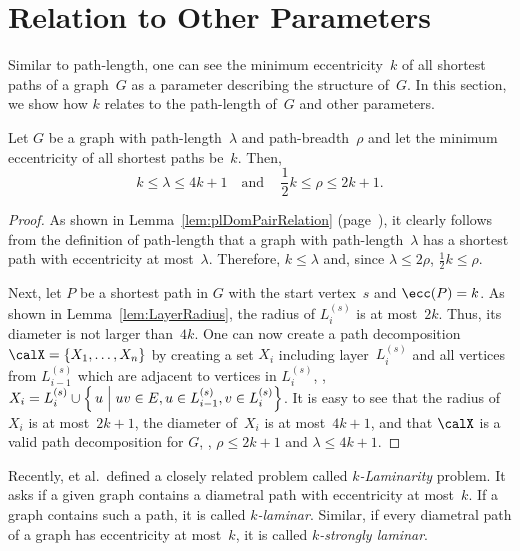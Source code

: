\section{Relation to Other Parameters}

Similar to path-length, one can see the minimum eccentricity~$k$ of all shortest paths of a graph~$G$ as a parameter describing the structure of~$G$.
In this section, we show how $k$ relates to the path-length of~$G$ and other parameters.

\begin{theorem}
    \label{theo:PathLengthMinEcc}
Let \( G \) be a graph with path-length~\( \lambda \) and path-breadth~\( \rho \) and let the minimum eccentricity of all shortest paths be~\( k \).
Then,
\[
    k \leq \lambda \leq 4k + 1 \quad \text{and} \, \quad \frac{1}{2} k \leq \rho \leq 2k + 1.
\]
\end{theorem}

\begin{proof}
As shown in Lemma~\ref{lem:plDomPairRelation} (page~\pageref{lem:plDomPairRelation}), it clearly follows from the definition of path-length that a graph with path-length~$\lambda$ has a shortest path with eccentricity at most~$\lambda$.
Therefore, $k \leq \lambda$ and, since $\lambda \leq 2 \rho$, $\frac{1}{2} k \leq \rho$.

Next, let $P$ be a shortest path in $G$ with the start vertex~$s$ and $\ecc(P) = k$.
As shown in Lemma~\ref{lem:LayerRadius}, the radius of $L_i^{(s)}$ is at most~$2k$.
Thus, its diameter is not larger than~$4k$.
One can now create a path decomposition $\calX = \{X_1, \ldots, X_n\}$ by creating a set $X_i$ including layer~$L_i^{(s)}$ and all vertices from $L_{i-1}^{(s)}$ which are adjacent to vertices in $L_i^{(s)}$, \ie, $X_i = L_i^{(s)} \cup \left \{ \, u \Bigm| uv \in E, u \in L_{i-1}^{(s)}, v \in L_i^{(s)} \right \}$.
It is easy to see that the radius of~$X_i$ is at most~$2k +1$, the diameter of~$X_i$ is at most~$4k +1$, and that $\calX$ is a valid path decomposition for $G$, \ie, $\rho \leq 2k + 1$ and $\lambda \leq 4k + 1$.
\end{proof}

Recently,  et al.\,\cite{VolBapHabLop2016} defined a closely related problem called \emph{\( k \)-Laminarity} problem.
It asks if a given graph contains a diametral path with eccentricity at most~$k$.
If a graph contains such a path, it is called \emph{\( k \)-laminar}.
Similar, if every diametral path of a graph has eccentricity at most~$k$, it is called \emph{\( k \)-strongly laminar}.

